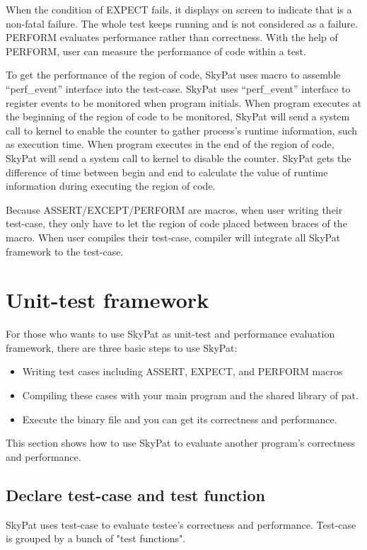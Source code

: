 \documentclass[final]{ols}
\begin{document}
When the condition of EXPECT fails, it displays on screen to indicate that is a non-fatal failure. 
The whole test keeps running and is not considered as a failure.
PERFORM evaluates performance rather than correctness. 
With the help of PERFORM, user can measure the performance of code within a test.

To get the performance of the region of code, SkyPat uses macro to assemble ``perf\_event'' interface into the test-case.
SkyPat uses ``perf\_event'' interface to register events to be monitored when program initials.
When program executes at the beginning of the region of code to be monitored, SkyPat will send a system call to kernel to enable the counter to gather process's runtime information, such as execution time.
When program executes in the end of the region of code, SkyPat will send a system call to kernel to disable the counter.
SkyPat gets the difference of time between begin and end to calculate the value of runtime information during executing the region of code.

Because ASSERT/EXCEPT/PERFORM are macros, when user writing their test-case, they only have to let the region of code placed between braces of the macro.
When user compiles their test-case, compiler will integrate all SkyPat framework to the test-case.

\section{Unit-test framework}
For those who wants to use SkyPat as unit-test and performance evaluation framework, there are three basic steps to use SkyPat:
\begin{itemize}
\item Writing test cases including ASSERT, EXPECT, and PERFORM macros
\item Compiling these cases with your main program and the shared library of pat.
\item Execute the binary file and you can get its correctness and performance.
\end{itemize}
This section shows how to use SkyPat to evaluate another program's correctness and performance.

\subsection{Declare test-case and test function}

SkyPat uses test-case to evaluate testee's correctness and performance. 
Test-case is grouped by a bunch of "test functions".
\end{document}

